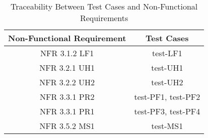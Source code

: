 \documentclass[12pt, titlepage]{article}
\begin{document}
\begin{table}[H]
  \begin{center}
    \caption{Traceability Between Test Cases and Non-Functional Requirements}
    \label{tab:table1}
    \begin{tabular}{c|c} 
        \toprule
        \textbf{Non-Functional Requirement} & \textbf{Test Cases}\\
        \midrule
        NFR 3.1.2 LF1 & test-LF1 \\
        \hline
        NFR 3.2.1 UH1 & test-UH1\\
        \hline
        NFR 3.2.2 UH2 & test-UH2\\
        \hline
        NFR 3.3.1 PR2 & test-PF1, test-PF2\\
        \hline
        NFR 3.3.1 PR1 & test-PF3, test-PF4\\
        \hline
        NFR 3.5.2 MS1 & test-MS1\\
        \bottomrule
    \end{tabular}
  \end{center}
\end{table}

\newpage
\end{document}
